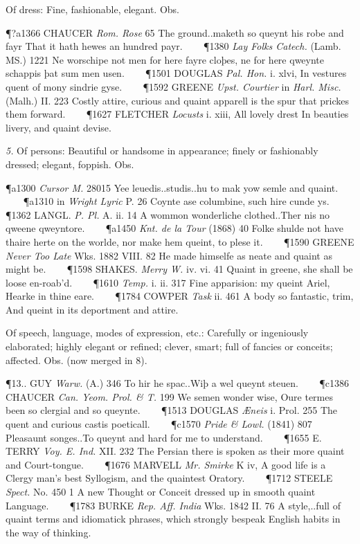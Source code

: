 \begin{description}[wide, labelwidth=!, labelindent=0pt]
\begin{myenumerate}
 Of dress: Fine, fashionable, elegant. Obs.

\P ?a1366 CHAUCER  \textit{Rom. Rose} 65 The ground..maketh so queynt his robe and fayr That it hath hewes an hundred payr.    
\P 1380 \textit{Lay  Folks Catech.} (Lamb. MS.) 1221 Ne worschipe  not men for here fayre cloþes, ne for here qweynte schappis þat sum men usen.    
\P 1501 DOUGLAS  \textit{Pal. Hon.} i. xlvi, In vestures quent of mony sindrie gyse.    
\P 1592 GREENE \textit{Upst. Courtier} in  \textit{Harl. Misc.} (Malh.) II. 223 Costly attire, curious and quaint apparell is the spur that prickes them forward.    
\P 1627 FLETCHER  \textit{Locusts} i. xiii, All lovely drest In beauties livery, and quaint devise.

\textit{5.} Of persons: Beautiful or handsome in appearance; finely or fashionably dressed; elegant, foppish. Obs.

\P a1300  \textit{Cursor M.} 28015 Yee leuedis..studis..hu to mak yow semle and quaint.    
\P a1310 in  \textit{Wright Lyric} P. 26 Coynte ase columbine, such hire cunde ys.    
\P 1362 LANGL.  \textit{P. Pl.} A. ii. 14 A wommon wonderliche clothed..Ther nis no qweene qweyntore.    
\P a1450  \textit{Knt. de la Tour} (1868) 40 Folke shulde not have thaire herte on the worlde, nor make hem queint, to plese it.    
\P 1590 GREENE  \textit{Never Too Late} Wks. 1882 VIII.  82 He made himselfe as neate and quaint as might be.    
\P 1598 SHAKES.  \textit{Merry W.} iv. vi. 41 Quaint in greene, she shall be loose en-roab'd.    
\P 1610   \textit{Temp.} i. ii. 317 Fine apparision: my queint Ariel, Hearke in thine eare.    
\P 1784 COWPER  \textit{Task} ii. 461 A body so fantastic, trim, And queint in its deportment and attire.

 Of speech, language, modes of expression, etc.: Carefully or ingeniously elaborated; highly elegant or refined; clever, smart; full of fancies or conceits; affected. Obs. (now merged in 8).

\P 13.. GUY  \textit{Warw.} (A.) 346 To hir he spac..Wiþ a wel queynt steuen.    
\P c1386 CHAUCER  \textit{Can. Yeom. Prol. \& T.} 199 We semen wonder wise, Oure termes been so clergial and so queynte.    
\P 1513 DOUGLAS  \textit{Æneis} i. Prol. 255 The quent and curious castis poeticall.    
\P c1570  \textit{Pride \& Lowl.} (1841) 807 Pleasaunt songes..To queynt and hard for me to understand.    
\P 1655 E. TERRY  \textit{Voy. E. Ind.} XII. 232 The Persian there is spoken as their more quaint and Court-tongue.    
\P 1676 MARVELL  \textit{Mr. Smirke} K iv, A good life is a Clergy man's best Syllogism, and the quaintest Oratory.    
\P 1712 STEELE  \textit{Spect.} No. 450 1 A new Thought or Conceit dressed up in smooth quaint Language.    
\P 1783 BURKE  \textit{Rep. Aff. India} Wks. 1842 II. 76 A  style,..full of quaint terms and idiomatick phrases, which strongly bespeak English habits in the way of thinking.


\end{myenumerate}
\end{description}
